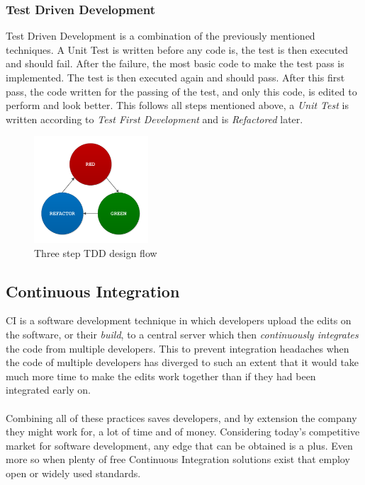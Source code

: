 \documentclass[11pt,british]{article}
\begin{document}
\subsubsection{Test Driven Development}
Test Driven Development is a combination of the previously mentioned techniques. A Unit Test is written before any code is, the test is then executed and should fail. After the failure, the most basic code to make the test pass is implemented. The test is then executed again and should pass. After this first pass, the code written for the passing of the test, and only this code, is edited to perform and look better. This follows all steps mentioned above, a \emph{Unit Test} is written according to \emph{Test First Development} and is \emph{Refactored} later.

\begin{figure}[h]
    \centering
	\includegraphics[width=0.38\textwidth]{images/tdd.pdf}
    \caption{Three step TDD design flow}
    \label{fig:TDD_Flow}
\end{figure}

\subsection{Continuous Integration}
\label{subsec:CI}
\gls{CI} is a software development technique in which developers upload the edits on the software, or their \emph{build}, to a central server which then \emph{continuously integrates} the code from multiple developers. This to prevent integration headaches when the code of multiple developers has diverged to such an extent that it would take much more time to make the edits work together than if they had been integrated early on.\\
\\
Combining all of these practices saves developers, and by extension the company they might work for, a lot of time and of money. Considering today's competitive market for software development, any edge that can be obtained is a plus. Even more so when plenty of free Continuous Integration solutions exist that employ open or widely used standards.
\end{document}
